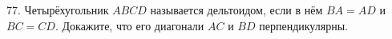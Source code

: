 77. Четырёхугольник $ABCD$ называется дельтоидом, если в нём $BA=AD$ и $BC=CD.$ Докажите, что его диагонали $AC$ и $BD$ перпендикулярны.\\
